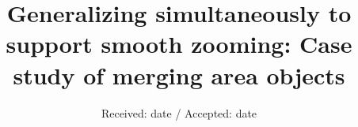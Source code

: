\documentclass[twocolumn]{svjour3}          %
\begin{document}
\title{Generalizing simultaneously to support smooth zooming:
Case study of merging area objects%
}






\date{Received: date / Accepted: date}





\maketitle
\end{document}
